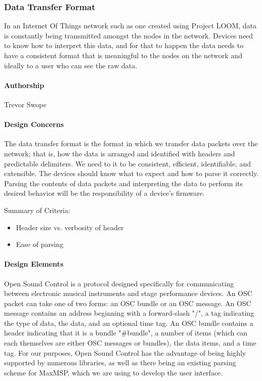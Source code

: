 \documentclass[onecolumn, draftclsnofoot,10pt, compsoc]{IEEEtran}
\begin{document}
\subsubsection{Data Transfer Format}
    In an Internet Of Things network such as one created using Project LOOM, data is constantly being transmitted amongst the nodes in the network. Devices need to know how to interpret this data, and for that to happen the data needs to have a consistent format that is meaningful to the nodes on the network and ideally to a user who can see the raw data.

\paragraph{Authorship}
    Trevor Swope

\paragraph{Design Concerns}
    The data transfer format is the format in which we transfer data packets over the network; that is, how the data is  arranged and identified with headers and predictable delimiters. We need to it to be consistent, efficient, identifiable, and extensible. The devices should know what to expect and how to parse it correctly. Parsing the contents of data packets and interpreting the data to perform its desired behavior will be the responsibility of a device's firmware. 

    Summary of Criteria:
    \begin{itemize}[noitemsep,topsep=-10pt]
        \item Header size vs. verbosity of header
        \item Ease of parsing
    \end{itemize}

\paragraph{Design Elements}
    Open Sound Control \cite{OSC} is a protocol designed specifically for communicating between electronic musical instruments and stage performance devices. An OSC packet can take one of two forms: an OSC bundle or an OSC message. An OSC message contains an address beginning with a forward-slash "/", a tag indicating the type of data, the data, and an optional time tag. An OSC bundle contains a header indicating that it is a bundle "\#bundle", a number of items (which can each themselves are either OSC messages or bundles), the data items, and a time tag. For our purposes, Open Sound Control has the advantage of being highly supported by numerous libraries, as well as there being an existing parsing scheme for MaxMSP, which we are using to develop the user interface.
\end{document}
